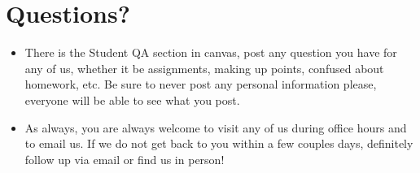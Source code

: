 \documentclass{article}
\begin{document}
\vspace{1.5cm}
\section*{Questions?}
\begin{itemize}
\item There is the Student QA section in canvas, 
    post any question you have for any of us, whether 
    it be assignments, making up points, confused 
    about homework, etc. Be sure to never post 
    any personal information please, everyone will 
    be able to see what you post.

\item As always, you are always welcome to visit any 
    of us during office hours and to email us.
    If we do not get back to you within a few couples days,
    definitely follow up via email or find us in person!
\end{itemize}
\end{document}
